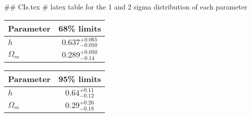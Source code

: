 ## CIs.tex
# latex table for the 1 and 2 sigma distribution of each parameter

\begin{tabular} { l  c}
 Parameter &  68\% limits\\
\hline
{\boldmath$h              $} & $0.637^{+0.065}_{-0.050}   $\\
{\boldmath$\Omega_m       $} & $0.289^{+0.050}_{-0.14}    $\\
\hline
\end{tabular}

\begin{tabular} { l  c}
 Parameter &  95\% limits\\
\hline
{\boldmath$h              $} & $0.64^{+0.11}_{-0.12}      $\\
{\boldmath$\Omega_m       $} & $0.29^{+0.26}_{-0.18}      $\\
\hline
\end{tabular}
